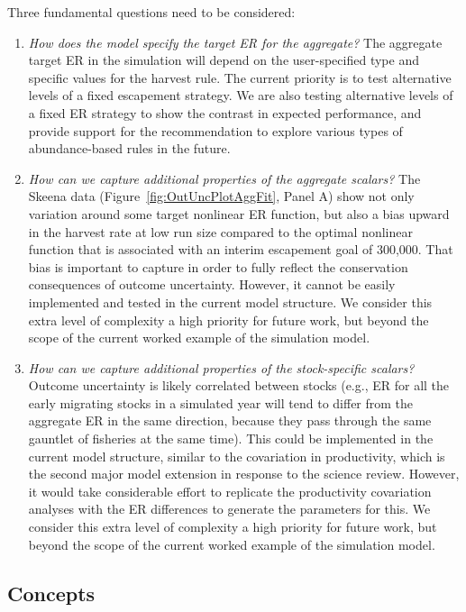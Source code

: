 \documentclass[french,11pt]{book}
\begin{document}
Three fundamental questions need to be considered:
\begin{enumerate}
\def\labelenumi{\arabic{enumi}.}

\item
  \emph{How does the model specify the target ER for the aggregate?} The aggregate target ER in the simulation will depend on the user-specified type and specific values for the harvest rule. The current priority is to test alternative levels of a fixed escapement strategy. We are also testing alternative levels of a fixed ER strategy to show the contrast in expected performance, and provide support for the recommendation to explore various types of abundance-based rules in the future.
\item
  \emph{How can we capture additional properties of the aggregate scalars?} The Skeena data (Figure~\ref{fig:OutUncPlotAggFit}, Panel A) show not only variation around some target nonlinear ER function, but also a bias upward in the harvest rate at low run size compared to the optimal nonlinear function that is associated with an interim escapement goal of 300,000. That bias is important to capture in order to fully reflect the conservation consequences of outcome uncertainty. However, it cannot be easily implemented and tested in the current model structure. We consider this extra level of complexity a high priority for future work, but beyond the scope of the current worked example of the simulation model.
\item
  \emph{How can we capture additional properties of the stock-specific scalars?} Outcome uncertainty is likely correlated between stocks (e.g., ER for all the early migrating stocks in a simulated year will tend to differ from the aggregate ER in the same direction, because they pass through the same gauntlet of fisheries at the same time). This could be implemented in the current model structure, similar to the covariation in productivity, which is the second major model extension in response to the science review. However, it would take considerable effort to replicate the productivity covariation analyses with the ER differences to generate the parameters for this. We consider this extra level of complexity a high priority for future work, but beyond the scope of the current worked example of the simulation model.
\end{enumerate}
\clearpage

\label{CovarProdApp}

\subsection{Concepts}\label{concepts}
\end{document}
